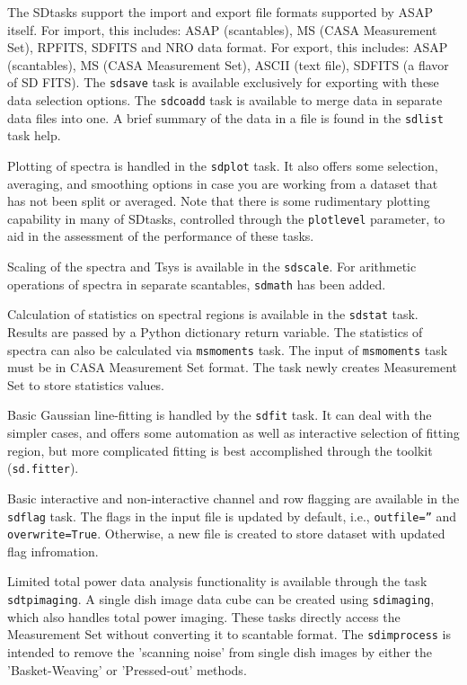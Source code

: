 The SDtasks support the import and export file formats supported
by ASAP itself.  For import, this includes:  ASAP (scantables), 
MS (CASA Measurement Set), RPFITS, SDFITS and NRO data format.  
For export, this includes: ASAP (scantables), MS (CASA Measurement Set),
ASCII (text file), SDFITS (a flavor of SD FITS).
The {\tt sdsave} task is available exclusively for exporting with these
data selection options.  The {\tt sdcoadd} task is available to merge data in separate data files
into one.  A brief summary of the data in a file is found in the {\tt sdlist}
task help.

Plotting of spectra is handled in the {\tt sdplot} task.  It also offers
some selection, averaging, and smoothing options in case you are
working from a dataset that has not been split or averaged.  Note that
there is some rudimentary plotting capability in many of SDtasks, 
controlled through the {\tt plotlevel} parameter, 
to aid in the assessment of the performance of these tasks.

Scaling of the spectra and Tsys is available in the {\tt sdscale}.
For arithmetic operations of spectra in separate scantables, {\tt sdmath}
has been added. 

Calculation of statistics on spectral regions is available in the {\tt sdstat} task.
Results are passed by a Python dictionary return variable.
The statistics of spectra can also be calculated via {\tt msmoments} task.
The input of {\tt msmoments} task must be in CASA Measurement Set format.
The task newly creates Measurement Set to store statistics values.

Basic Gaussian line-fitting is handled by the {\tt sdfit} task.  It can deal
with the simpler cases, and offers some automation as well as interactive 
selection of fitting region, but more complicated
fitting is best accomplished through the toolkit ({\tt sd.fitter}).

Basic interactive and non-interactive channel and row flagging are available 
in the {\tt sdflag} task. 
The flags in the input file is updated by default, i.e., {\tt outfile=''} 
and {\tt overwrite=True}. Otherwise, a new file is created to store dataset
with updated flag infromation.

Limited total power data analysis functionality is available through 
the task {\tt sdtpimaging}. A single dish image data cube can be created
using  {\tt sdimaging}, which also handles total power imaging.
These tasks directly access the Measurement Set without converting it to scantable format.
The {\tt sdimprocess} is intended to remove the 'scanning noise' from single dish
images by either the 'Basket-Weaving' or 'Pressed-out' methods.

